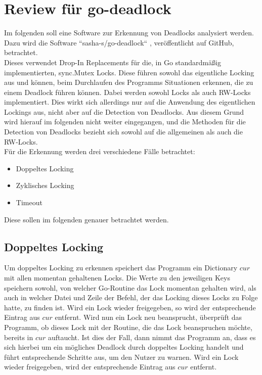 \chapter{Review für go-deadlock}\label{Chap::Review:go-deadlock}
Im folgenden soll eine Software zur Erkennung von Deadlocks analysiert werden.
Dazu wird die Software ``sasha-s/go-deadlock`` \cite{sasha-s}, veröffentlicht 
auf GitHub, betrachtet.\\
Dieses verwendet Drop-In Replacements für die, in Go standardmäßig 
implementierten, sync.Mutex Locks. Diese führen sowohl das eigentliche 
Locking aus und können, beim Durchlaufen des Programms Situationen erkennen, 
die zu einem Deadlock führen können. Dabei werden sowohl Locks
als auch RW-Locks implementiert. Dies wirkt sich allerdings nur auf
die Anwendung des eigentlichen Lockings aus, nicht aber auf die Detection von 
Deadlocks. Aus diesem Grund wird hierauf im folgenden nicht weiter eingegangen, 
und die Methoden für die Detection von Deadlocks bezieht sich sowohl auf die
allgemeinen als auch die RW-Locks.\\
Für die Erkennung werden drei verschiedene Fälle betrachtet:
\begin{itemize}
    \item Doppeltes Locking
    \item Zyklisches Locking
    \item Timeout
\end{itemize}
Diese sollen im folgenden genauer betrachtet werden.

\section{Doppeltes Locking}\label{Kap::Rev:Recursive}
Um doppeltes Locking zu erkennen speichert das Programm ein Dictionary $cur$ mit 
allen momentan gehaltenen 
Locks. Die Werte zu den jeweiligen Keys speichern sowohl, von welcher Go-Routine das 
Lock momentan gehalten wird, als auch in welcher Datei und Zeile der Befehl,
der das Locking dieses Locks zu Folge hatte, zu finden ist. Wird ein Lock 
wieder freigegeben, so wird der entsprechende Eintrag aus $cur$ entfernt. 
Wird nun ein Lock neu beansprucht, überprüft 
das Programm, ob dieses Lock mit der Routine, die das Lock beanspruchen möchte,
bereits in $cur$ auftaucht. Ist dies der Fall, dann nimmt das
Programm an, dass es sich hierbei um ein mögliches Deadlock durch doppeltes Locking
handelt und führt 
entsprechende Schritte aus, um den Nutzer zu warnen. Wird ein Lock wieder freigegeben, wird der entsprechende Eintrag aus $cur$ entfernt.


